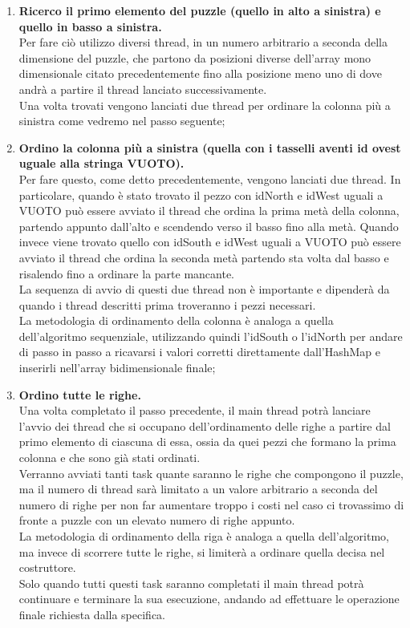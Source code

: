 	\begin{enumerate}
		\item \textbf{Ricerco il primo elemento del puzzle (quello in alto a sinistra) e quello in basso a sinistra.} \\
		Per fare ciò utilizzo diversi thread, in un numero arbitrario a seconda della dimensione del puzzle, che partono da posizioni diverse dell'array mono dimensionale citato precedentemente fino alla posizione meno uno di dove andrà a partire il thread lanciato successivamente. \\
		Una volta trovati vengono lanciati due thread per ordinare la colonna più a sinistra come vedremo nel passo seguente;
		\item \textbf{Ordino la colonna più a sinistra (quella con i tasselli aventi id ovest uguale alla stringa VUOTO).} \\
		Per fare questo, come detto precedentemente, vengono lanciati due thread. In particolare, quando è stato trovato il pezzo con idNorth e idWest uguali a VUOTO può essere avviato il thread che ordina la prima metà della colonna, partendo appunto dall'alto e scendendo verso il basso fino alla metà. Quando invece viene trovato quello con idSouth e idWest uguali a VUOTO può essere avviato il thread che ordina la seconda metà partendo sta volta dal basso e risalendo fino a ordinare la parte mancante. \\
		La sequenza di avvio di questi due thread non è importante e dipenderà da quando i thread descritti prima troveranno i pezzi necessari. \\
		La metodologia di ordinamento della colonna è analoga a quella dell'algoritmo sequenziale, utilizzando quindi l'idSouth o l'idNorth per andare di passo in passo a ricavarsi i valori corretti direttamente dall'HashMap e inserirli nell'array bidimensionale finale;
		\item \textbf{Ordino tutte le righe.} \\
		Una volta completato il passo precedente, il main thread potrà lanciare l'avvio dei thread che si occupano dell'ordinamento delle righe a partire dal primo elemento di ciascuna di essa, ossia da quei pezzi che formano la prima colonna e che sono già stati ordinati. \\
		Verranno avviati tanti task quante saranno le righe che compongono il puzzle, ma il numero di thread sarà limitato a un valore arbitrario a seconda del numero di righe per non far aumentare troppo i costi nel caso ci trovassimo di fronte a puzzle con un elevato numero di righe appunto. \\
		La metodologia di ordinamento della riga è analoga a quella dell'algoritmo, ma invece di scorrere tutte le righe, si limiterà a ordinare quella decisa nel costruttore. \\
		Solo quando tutti questi task saranno completati il main thread potrà continuare e terminare la sua esecuzione, andando ad effettuare le operazione finale richiesta dalla specifica.
	\end{enumerate}






